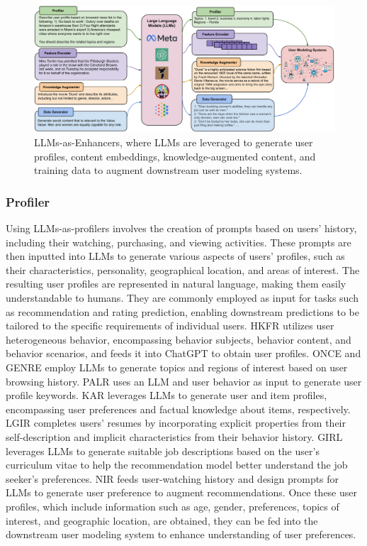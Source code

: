 \documentclass[11pt]{article}
\begin{document}
\begin{figure}[t]
    \centering
    \includegraphics[width=0.95\linewidth]{submissions/Meng2023/figs/LLM-UM Enhancers.pdf}
    \caption{LLMs-as-Enhancers, where LLMs are leveraged to generate user profiles, content embeddings, knowledge-augmented content, and training data to augment downstream user modeling systems.}
    \label{fig:enter-label}
\end{figure}
\label{sec:approach_enhancer}

\subsubsection{Profiler}
Using LLMs-as-profilers involves the creation of prompts based on users' history, including their watching, purchasing, and viewing activities. These prompts are then inputted into LLMs to generate various aspects of users' profiles, such as their characteristics, personality, geographical location, and areas of interest. The resulting user profiles are represented in natural language, making them easily understandable to humans. They are commonly employed as input for tasks such as recommendation and rating prediction, enabling downstream predictions to be tailored to the specific requirements of individual users. HKFR \cite{yin2023heterogeneous} utilizes user heterogeneous behavior, encompassing behavior subjects, behavior content, and behavior scenarios, and feeds it into ChatGPT to obtain user profiles. ONCE \cite{liu2023once} and GENRE \cite{liu2023genre} employ LLMs to generate topics and regions of interest based on user browsing history. PALR \cite{chen2023palr} uses an LLM and user behavior as input to generate user profile keywords. KAR \cite{xi2023towards} leverages LLMs to generate user and item profiles, encompassing user preferences and factual knowledge about items, respectively. LGIR \cite{du2023enhancing} completes users' resumes by incorporating explicit properties from their self-description and implicit characteristics from their behavior history. GIRL \cite{zheng2023generative} leverages LLMs to generate suitable job descriptions based on the user's curriculum vitae to help the recommendation model better understand the job seeker's preferences. NIR \cite{wang2023zero} feeds user-watching history and design prompts for LLMs to generate user preference to augment recommendations.
Once these user profiles, which include information such as age, gender, preferences, topics of interest, and geographic location, are obtained, they can be fed into the downstream user modeling system to enhance understanding of user preferences.
\end{document}
